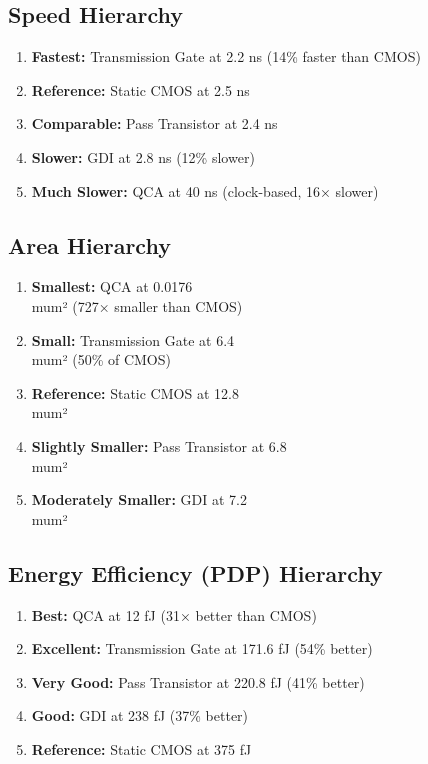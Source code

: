\documentclass[12pt,a4paper,twoside]{report}
\begin{document}
\subsection{Speed Hierarchy}

\begin{enumerate}
    \item \textbf{Fastest:} Transmission Gate at 2.2 ns (14\% faster than CMOS)
    \item \textbf{Reference:} Static CMOS at 2.5 ns
    \item \textbf{Comparable:} Pass Transistor at 2.4 ns
    \item \textbf{Slower:} GDI at 2.8 ns (12\% slower)
    \item \textbf{Much Slower:} QCA at 40 ns (clock-based, 16× slower)
\end{enumerate}

\subsection{Area Hierarchy}

\begin{enumerate}
    \item \textbf{Smallest:} QCA at 0.0176 \\mum² (727× smaller than CMOS)
    \item \textbf{Small:} Transmission Gate at 6.4 \\mum² (50\% of CMOS)
    \item \textbf{Reference:} Static CMOS at 12.8 \\mum²
    \item \textbf{Slightly Smaller:} Pass Transistor at 6.8 \\mum²
    \item \textbf{Moderately Smaller:} GDI at 7.2 \\mum²
\end{enumerate}

\subsection{Energy Efficiency (PDP) Hierarchy}

\begin{enumerate}
    \item \textbf{Best:} QCA at 12 fJ (31× better than CMOS)
    \item \textbf{Excellent:} Transmission Gate at 171.6 fJ (54\% better)
    \item \textbf{Very Good:} Pass Transistor at 220.8 fJ (41\% better)
    \item \textbf{Good:} GDI at 238 fJ (37\% better)
    \item \textbf{Reference:} Static CMOS at 375 fJ
\end{enumerate}
\end{document}
